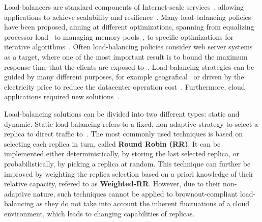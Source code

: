 Load-balancers are standard components of Internet-scale
services~\cite{WangOSDI}, allowing applications to achieve scalability
and resilience~\citep{Barroso09, Hamilton07:LISA,
  clusteredbalancing}. Many load-balancing policies have been
proposed, aiming at different optimizations, spanning from equalizing
processor load~\cite{Stankovic:TC} to managing memory
pools~\cite{PattersonMemoryLB,MemoryLBACC}, to specific optimizations
for iterative algorithms~\cite{BahiIterative}. Often load-balancing
policies consider web server systems~\cite{CLB,Cardellini2003} as a
target, where one of the most important result is to bound the maximum
response time that the clients are exposed
to~\cite{TC-Abdelzaher}. Load-balancing strategies can be guided by
many different purposes, for example
geografical~\cite{GeograficalSASO,geographicalwanbalancing} or driven
by the electricity price to reduce the datacenter operation
cost~\cite{LoadBalancingForElectricity:TCC}. Furthermore, cloud
applications required new
solutions~\citep{Barroso09,Lu11:PerfEval,Lin12:IGCC}.


Load-balancing solutions can be divided into two different types:
static and dynamic. Static load-balancing refers to a fixed,
non-adaptive strategy to select a replica to direct traffic
to~\cite{StaticLoadBalancing:TSE,StaticOptimal:ACM}.  The most
commonly used techniques is based on selecting each replica in turn,
called \textbf{Round Robin (RR)}. It can be implemented either
deterministically, by storing the last selected replica, or
probabilistically, by picking a replica at random.  This technique can
further be improved by weighting the replica selection based on a
priori knowledge of their relative capacity, refered to as
\textbf{Weighted-RR}.  However, due to their non-adaptive nature, such
techniques cannot be applied to brownout-compliant load-balancing as
they do not take into account the inherent fluctuations of a cloud
environment, which leads to changing capabilities of replicas.


